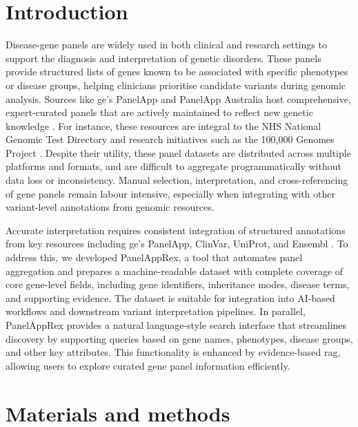 \section{Introduction}
\noindent
Disease-gene panels are widely used in both clinical and research settings to support the diagnosis and interpretation of genetic disorders. 
These panels provide structured lists of genes known to be associated with specific phenotypes or disease groups, helping clinicians prioritise candidate variants during genomic analysis. 
Sources like \ac{ge}’s PanelApp and PanelApp Australia host comprehensive, expert-curated panels that are actively maintained to reflect new genetic knowledge \cite{martin_panelapp_2019}. 
For instance, these resources are integral to the NHS National Genomic Test Directory and research initiatives such as the 100,000 Genomes Project \cite{martin_panelapp_2019}. 
Despite their utility, these panel datasets are distributed across multiple platforms and formats, and are difficult to aggregate programmatically without data loss or inconsistency. 
Manual selection, interpretation, and cross-referencing of gene panels remain labour intensive, especially when integrating with other variant-level annotations from genomic resources. 

Accurate interpretation requires consistent integration of structured annotations from key resources including \ac{ge}’s PanelApp, ClinVar, UniProt, and Ensembl \cite{martin_panelapp_2019, landrum_clinvar_2018, the_uniprot_consortium_uniprot_2025, dyer_ensembl_2025}. 
To address this, we developed PanelAppRex, a tool that automates panel aggregation and prepares a machine-readable dataset with complete coverage of core gene-level fields, including gene identifiers, inheritance modes, disease terms, and supporting evidence. 
The dataset is suitable for integration into AI-based workflows and downstream variant interpretation pipelines. 
In parallel, PanelAppRex provides a natural language-style search interface that streamlines discovery by supporting queries based on gene names, phenotypes, disease groups, and other key attributes. 
This functionality is enhanced by evidence-based \ac{rag}, allowing users to explore curated gene panel information efficiently. 

\section{Materials and methods}

